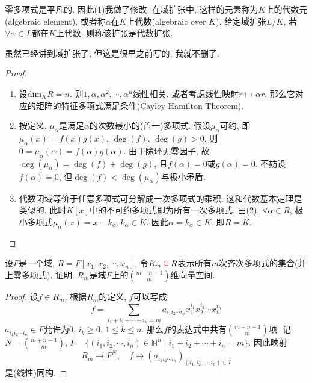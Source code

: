 \documentclass{../solutions-cn}
\begin{document}
\begin{remark}
    零多项式是平凡的, 因此(1)我做了修改. 在域扩张中, 这样的元素称为$K$上的代数元(algebraic element), 或者称$\alpha$在$K$上代数(algebraic over $K$). 给定域扩张$L/K$, 若$\forall \alpha \in L$都在$K$上代数, 则称该扩张是代数扩张.

    虽然已经讲到域扩张了, 但这是很早之前写的, 我就不删了.
\end{remark}

\begin{proof}
    \begin{enumerate}[(1)]
        \item 设$\mathrm{dim}_K R = n$. 则$1, \alpha, \alpha^2, \cdots, \alpha^n$线性相关. 或者考虑线性映射$r \mapsto \alpha r$. 那么它对应的矩阵的特征多项式满足条件(Cayley-Hamilton Theorem).
        \item 按定义, $\mu_\alpha$是满足$\alpha$的次数最小的(首一)多项式. 假设$\mu_\alpha$可约, 即$\mu_\alpha(x) = f(x)g(x),\, \deg(f),\, \deg(g)> 0$, 则$0 = \mu_\alpha(\alpha) = f(\alpha)g(\alpha)$. 由于除环无零因子, 故$\deg(\mu_\alpha) = \deg(f) + \deg(g)$, 且$f(\alpha) = 0$或$g(\alpha) = 0$. 不妨设$f(\alpha) = 0$, 但$\deg(f) < \deg (\mu_\alpha)$与极小矛盾.
        \item 代数闭域等价于任意多项式可分解成一次多项式的乘积. 这和代数基本定理是类似的. 此时$K[x]$中的不可约多项式即为所有一次多项式. 由(2), $\forall \alpha \in R$, 极小多项式$\mu_\alpha(x) = x - k_\alpha, k_\alpha \in K$. 因此$\alpha = k_\alpha \in K$. 即$R = K$.
    \end{enumerate}
\end{proof}

\begin{exercise}[习题2.4.1]
    设$F$是一个域, $R = F[x_1, x_2, \cdots, x_n]$, 令$R_m \,\textcolor{red}{\subseteq}\, R$表示所有$m$次齐次多项式的集合(并上零多项式). 证明: $R_m$是域$F$上的$\binom{m + n - 1}{m}$维向量空间.
\end{exercise}

\begin{proof}
    设$f \in R_m$, 根据$R_m$的定义, $f$可以写成
    \[
        f = \sum_{i_1 + i_2 + \cdots + i_n = m} a_{i_1i_2 \cdots i_n}x_1^{i_1}x_2^{i_2} \cdots x_n^{i_n}
    \]
    $a_{i_1i_2 \cdots i_n} \in F$允许为$0$, $i_k \geqslant 0,\, 1 \leqslant k \leqslant n$. 那么$f$的表达式中共有$\binom{m + n - 1}{m}$项. 记$N = \binom{m + n - 1}{m}$, $I = \{(i_1, i_2, \cdots, i_n) \in \mathbb{N}^n \mid i_1 + i_2 + \cdots + i_n = m\}$. 因此映射
    \[
        R_m \to F^{N},\quad f \mapsto (a_{i_1i_2 \cdots i_n})_{(i_1, i_2, \cdots, i_n) \in I}
    \]
    是(线性)同构.
\end{proof}
\end{document}

